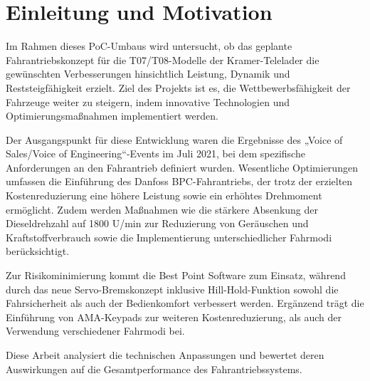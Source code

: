 \documentclass[a4paper, 12pt]{article} %
\begin{document}
\section{Einleitung und Motivation}
\begin{spacing}{1.5}  %
\fontsize{14pt}{14pt}\selectfont  %
Im Rahmen dieses \acf{PoC}-Umbaus wird untersucht, ob das 
geplante Fahrantriebskonzept für die T07/T08-Modelle der Kramer-Telelader 
die gewünschten Verbesserungen hinsichtlich Leistung, Dynamik und 
Reststeigfähigkeit erzielt. Ziel des Projekts ist es, die Wettbewerbsfähigkeit
 der Fahrzeuge weiter zu steigern, indem innovative Technologien und 
 Optimierungsmaßnahmen implementiert werden.

Der Ausgangspunkt für diese Entwicklung waren die Ergebnisse des
 „Voice of Sales/Voice of Engineering“-Events im Juli 2021, bei dem 
 spezifische Anforderungen an den Fahrantrieb definiert wurden. 
 Wesentliche Optimierungen umfassen die Einführung des Danfoss 
 \acf{BPC}-Fahrantriebs, der trotz der erzielten Kostenreduzierung eine höhere 
 Leistung sowie ein erhöhtes Drehmoment ermöglicht. Zudem werden Maßnahmen 
 wie die stärkere Absenkung der Dieseldrehzahl auf 1800 U/min zur Reduzierung
  von Geräuschen und Kraftstoffverbrauch sowie die Implementierung 
  unterschiedlicher Fahrmodi berücksichtigt.

Zur Risikominimierung kommt die Best Point Software zum 
Einsatz, während durch das neue Servo-Bremskonzept inklusive 
Hill-Hold-Funktion sowohl die Fahrsicherheit als auch der Bedienkomfort 
verbessert werden. Ergänzend trägt die Einführung von AMA-Keypads zur weiteren 
Kostenreduzierung, als auch der Verwendung verschiedener Fahrmodi bei.

Diese Arbeit analysiert die technischen 
Anpassungen und bewertet deren Auswirkungen auf die 
Gesamtperformance des Fahrantriebssystems.
\end{spacing}
\end{document}
